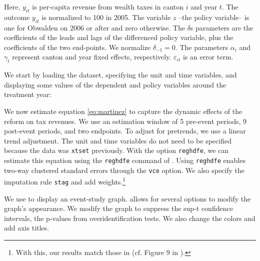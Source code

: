 \documentclass[bib]{./sty/statapress}
\begin{document}
Here, $y_{it}$ is per-capita revenue from wealth taxes in canton $i$ and year $t$.
The outcome $y_{it}$ is normalized to 100 in 2005.
The variable $z$ --the policy variable-- is one for Obwalden on 2006 or after and zero otherwise.
The $\delta$s parameters are the coefficients of the leads and lags of the differenced policy variable, plus the coefficients of the two end-points.
We normalize $\delta_{-1} = 0$.
The parameters $\alpha_i$ and $\gamma_{t}$ represent canton and year fixed effects, respectively.
$\varepsilon_{it}$ is an error term.

We start by loading the dataset, specifying the unit and time variables, and displaying some values of the dependent and policy variables around the treatment year:

\begin{stlog}
\nullskip
\end{stlog}

We now estimate equation \ref{eq:martinez} to capture the dynamic effects of the reform on tax revenues.
We use an estimation window of 5 pre-event periods, 9 post-event periods, and two endpoints.
To adjust for pretrends, we use a linear trend adjustment.
The unit and time variables do not need to be specified because the data was \texttt{xtset} previously.
With the option \texttt{reghdfe}, we can estimate this equation using the \texttt{reghdfe} command of \citet{Correia2017:HDFE}.
Using \texttt{reghdfe} enables two-way clustered standard errors through the \texttt{vce} option.
We also specify the imputation rule \texttt{stag} and add weights.\footnote{With this, our results match those in \citet{martinez2022mobility} (cf. Figure 9 in \citeauthor{martinez2022mobility} \citeyear{martinez2022mobility}).}

\begin{stlog}
\nullskip
\end{stlog}

We use \xteventplot to display an event-study graph.
\xtevent allows for several options to modify the graph's appearance.
We modify the graph to suppress the sup-t confidence intervals, the p-values from overidentification tests.
We also change the colors and add axis titles.

\begin{stlog}
\nullskip
\end{stlog}
\end{document}
